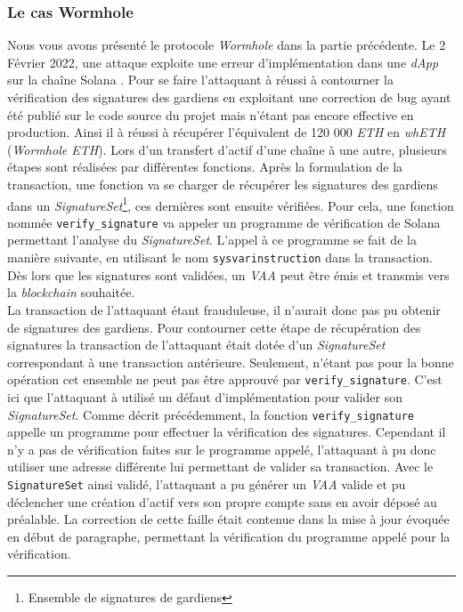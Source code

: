 \subsubsection{Le cas \gls{Wormhole}}
Nous vous avons présenté le protocole \textit{\gls{Wormhole}} dans la partie précédente. 
Le 2 Février 2022, une attaque exploite une erreur d'implémentation dans une \textit{\gls{dApp}} sur la chaîne \gls{Solana} \cite{SolMed} \cite{SolRekt}. 
Pour se faire l'attaquant à réussi à contourner la vérification des signatures des gardiens en exploitant
une correction de bug ayant été publié sur le code source du projet mais n'étant pas encore effective en production.
Ainsi il à réussi à récupérer l'équivalent de 120 000 \textit{ETH} en \textit{whETH} (\textit{\gls{Wormhole} ETH}). 
Lors d'un transfert d'\gls{actif} d'une chaîne à une autre, plusieurs étapes sont réalisées par différentes fonctions.
Après la formulation de la transaction, une fonction va se charger de récupérer les signatures des gardiens dans un \textit{SignatureSet}\footnote{Ensemble de signatures de gardiens}, ces dernières sont ensuite vérifiées. 
Pour cela, une fonction nommée \texttt{verify\_signature} va appeler un programme de vérification de Solana permettant l'analyse du \textit{SignatureSet}. 
L'appel à ce programme se fait de la manière suivante, en utilisant le nom \texttt{sysvarinstruction} \cite{SolGitError} dans la transaction. 
Dès lors que les signatures sont validées, un \textit{VAA} peut être émis et transmis vers la \textit{\gls{blockchain}} souhaitée. \\
La transaction de l'attaquant étant frauduleuse, il n'aurait donc pas pu obtenir de signatures des gardiens. 
Pour contourner cette étape de récupération des signatures la transaction de l'attaquant était dotée d'un \textit{SignatureSet} correspondant à une transaction antérieure. 
Seulement, n'étant pas pour la bonne opération cet ensemble ne peut pas être approuvé par \texttt{verify\_signature}. 
C'est ici que l'attaquant à utilisé un défaut d'implémentation pour valider son \textit{SignatureSet}. 
Comme décrit précédemment, la fonction \texttt{verify\_signature} appelle un programme pour effectuer la vérification des signatures. 
Cependant il n'y a pas de vérification faites sur le programme appelé, l'attaquant à pu donc utiliser une adresse différente lui permettant de valider sa transaction. 
Avec le  \texttt{SignatureSet} ainsi validé, l'attaquant a pu générer un \textit{VAA} valide et pu déclencher une création d'\gls{actif} vers son propre compte sans en avoir déposé au préalable. 
La correction de cette faille était contenue dans la mise à jour évoquée en début de paragraphe\cite{SolGitFixed}, permettant la vérification du programme appelé pour la vérification. 

